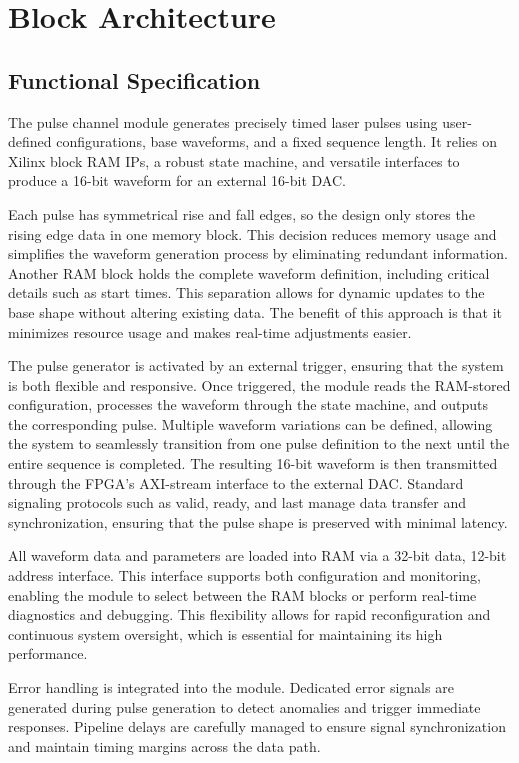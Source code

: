\chapter{Block Architecture}

\section{Functional Specification}

The pulse channel module generates precisely timed laser pulses using user-defined configurations, base waveforms, and a fixed sequence length. It relies on Xilinx block RAM IPs, a robust state machine, and versatile interfaces to produce a 16-bit waveform for an external 16-bit DAC.

Each pulse has symmetrical rise and fall edges, so the design only stores the rising edge data in one memory block. This decision reduces memory usage and simplifies the waveform generation process by eliminating redundant information. Another RAM block holds the complete waveform definition, including critical details such as start times. This separation allows for dynamic updates to the base shape without altering existing data. The benefit of this approach is that it minimizes resource usage and makes real-time adjustments easier.

The pulse generator is activated by an external trigger, ensuring that the system is both flexible and responsive. Once triggered, the module reads the RAM-stored configuration, processes the waveform through the state machine, and outputs the corresponding pulse. Multiple waveform variations can be defined, allowing the system to seamlessly transition from one pulse definition to the next until the entire sequence is completed. The resulting 16-bit waveform is then transmitted through the FPGA's AXI-stream interface to the external DAC. Standard signaling protocols such as valid, ready, and last manage data transfer and synchronization, ensuring that the pulse shape is preserved with minimal latency.

All waveform data and parameters are loaded into RAM via a 32-bit data, 12-bit address interface. This interface supports both configuration and monitoring, enabling the module to select between the RAM blocks or perform real-time diagnostics and debugging. This flexibility allows for rapid reconfiguration and continuous system oversight, which is essential for maintaining its high performance.

Error handling is integrated into the module. Dedicated error signals are generated during pulse generation to detect anomalies and trigger immediate responses. Pipeline delays are carefully managed to ensure signal synchronization and maintain timing margins across the data path.

